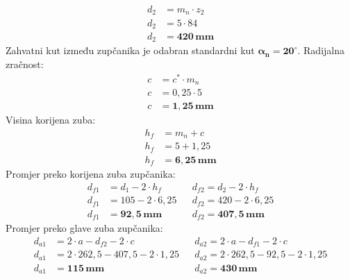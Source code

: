 \documentclass[11pt,a4paper,openright,twoside]{report}
\begin{document}
\begin{align*}
d_2&=m_n \cdot z_2\\
d_2&=5 \cdot 84\\
d_2&=\mathbf{420 \,mm}
\end{align*}
Zahvatni kut između zupčanika je odabran standardni kut $\mathbf{\alpha_n=20^\circ}$.
Radijalna zračnost:
\begin{align*}
c&=c^* \cdot m_n\\
c&=0,25 \cdot 5\\
c&= \mathbf{1,25 \, mm}
\end{align*}
Visina korijena zuba:
\begin{align*}
h_f&=m_n+c\\
h_f&=5+1,25\\
h_f&=\mathbf{6,25 \,mm}
\end{align*}
Promjer preko korijena zuba zupčanika:
\begin{align*}
d_{f1}&=d_1-2 \cdot h_f && d_{f2}=d_2-2 \cdot h_f\\
d_{f1}&=105-2 \cdot 6,25 && d_{f2}=420-2 \cdot 6,25\\
d_{f1}&=\mathbf{92,5 \,mm} && d_{f2}=\mathbf{407,5 \,mm}
\end{align*}
Promjer preko glave zuba zupčanika:
\begin{align*}
d_{a1}&=2 \cdot a - d_{f2} - 2 \cdot c  && d_{a2}=2 \cdot a - d_{f1} - 2 \cdot c\\
d_{a1}&=2 \cdot 262,5 - 407,5 - 2 \cdot 1,25 && d_{a2}=2 \cdot 262,5 - 92,5 - 2 \cdot 1,25\\
d_{a1}&=\mathbf{115 \,mm} && d_{a2}=\mathbf{430 \,mm}
\end{align*}
\end{document}
